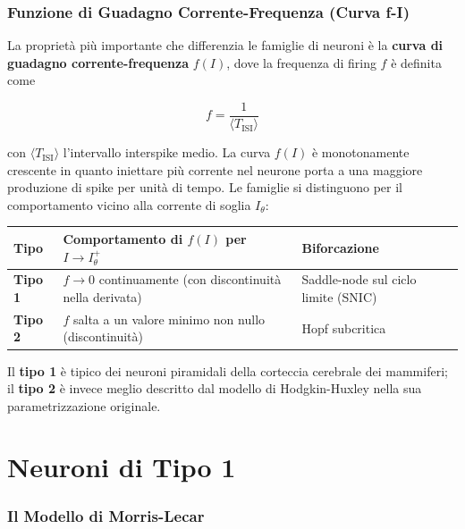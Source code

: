 \subsubsection{Funzione di Guadagno Corrente-Frequenza (Curva f-I)}

La proprietà più importante che differenzia le famiglie di neuroni è la \textbf{curva di guadagno corrente-frequenza} $f(I)$, dove la frequenza di firing $f$ è definita come

\begin{equation}
f = \frac{1}{\langle T_{\text{ISI}} \rangle}
\end{equation}

con $\langle T_{\text{ISI}} \rangle$ l'intervallo interspike medio. La curva $f(I)$ è monotonamente crescente in quanto iniettare più corrente nel neurone porta a una maggiore produzione di spike per unità di tempo. Le famiglie si distinguono per il comportamento vicino alla corrente di soglia $I_\theta$:

\begin{table}[htbp]
    \centering
    \renewcommand{\arraystretch}{1.3}
    \begin{tabularx}{\textwidth}{|>{\raggedright\arraybackslash}p{2cm}|X|>{\raggedright\arraybackslash}p{4.5cm}|}
    \hline
    \textbf{Tipo} & \textbf{Comportamento di $f(I)$ per $I \to I_\theta^+$} & \textbf{Biforcazione} \\
    \hline
    \textbf{Tipo 1} & $f \to 0$ continuamente (con discontinuità nella derivata) & Saddle-node sul ciclo limite (SNIC) \\
    \hline
    \textbf{Tipo 2} & $f$ salta a un valore minimo non nullo (discontinuità) & Hopf subcritica \\
    \hline
    \end{tabularx}
\end{table}

Il \textbf{tipo 1} è tipico dei neuroni piramidali della corteccia cerebrale dei mammiferi; il \textbf{tipo 2} è invece meglio descritto dal modello di Hodgkin-Huxley nella sua parametrizzazione originale.

\section{Neuroni di Tipo 1}

\subsubsection{Il Modello di Morris-Lecar}

